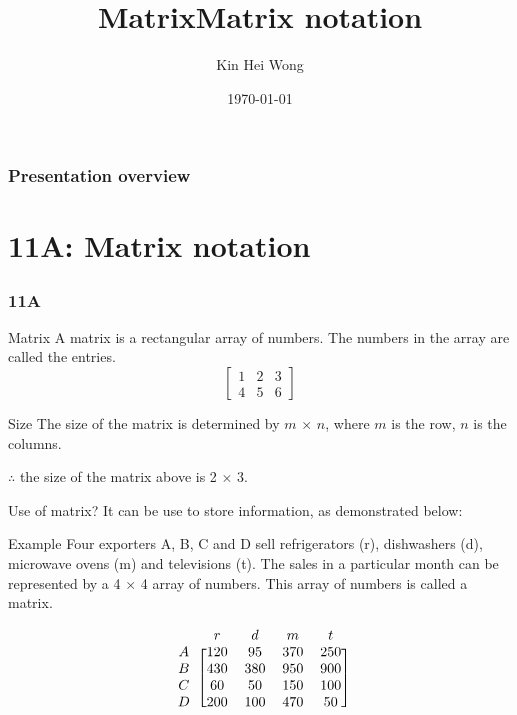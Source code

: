 \documentclass[
	11pt, %
]{beamer}
\title{Matrix}
\author{Kin Hei Wong}
\date{\today}
\begin{document}
\begin{frame}
    \titlepage
\end{frame}

\begin{frame}
    \frametitle{Presentation overview}
    \tableofcontents
\end{frame}

\section{11A: Matrix notation}
\begin{frame}
    \frametitle{11A}
    \begin{center}
        \title{Matrix notation}
        \maketitle
    \end{center}
\end{frame}

\begin{frame}{Matrix}
    A matrix is a rectangular array of numbers. The numbers in the array are called the entries.\\
    \[
        \begin{bmatrix}
        1 & 2 & 3\\
        4 & 5 & 6
    \end{bmatrix}
    \]
    \bigskip
    \begin{block}{Size}
        The size of the matrix is determined by $m$ $\times$ $n$, where $m$ is the row, $n$ is the columns.
    \end{block}
    $\therefore$ the size of the matrix above is 2 $\times$ 3.
\end{frame}

\begin{frame}{Use of matrix?}
    It can be use to store information, as demonstrated below:\\
    \begin{block}{Example}
        Four exporters A, B, C and D sell refrigerators (r), dishwashers (d), microwave ovens (m) and
        televisions (t). The sales in a particular month can be represented by a 4 $\times$ 4 array of numbers.
        This array of numbers is called a matrix.
    \end{block}
    \[
    \begin{blockarray}{ccccc}
        & r & d & m & t & \\
        \begin{block}{c[cccc]}
            A & 120 & 95 & 370 & 250\\
            B & 430 & 380 & 950 & 900\\
            C & 60 & 50 & 150 & 100\\
            D & 200 & 100 & 470 & 50\\
        \end{block}
    \end{blockarray}
    \]
\end{frame}
\end{document}
